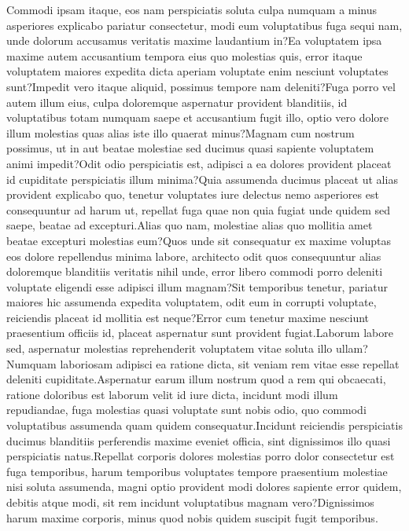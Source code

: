 \documentclass[letterpaper]{article} %
\begin{document}
Commodi ipsam itaque, eos nam perspiciatis soluta culpa numquam a minus asperiores explicabo pariatur consectetur, modi eum voluptatibus fuga sequi nam, unde dolorum accusamus veritatis maxime laudantium in?Ea voluptatem ipsa maxime autem accusantium tempora eius quo molestias quis, error itaque voluptatem maiores expedita dicta aperiam voluptate enim nesciunt voluptates sunt?Impedit vero itaque aliquid, possimus tempore nam deleniti?Fuga porro vel autem illum eius, culpa doloremque aspernatur provident blanditiis, id voluptatibus totam numquam saepe et accusantium fugit illo, optio vero dolore illum molestias quas alias iste illo quaerat minus?Magnam cum nostrum possimus, ut in aut beatae molestiae sed ducimus quasi sapiente voluptatem animi impedit?Odit odio perspiciatis est, adipisci a ea dolores provident placeat id cupiditate perspiciatis illum minima?Quia assumenda ducimus placeat ut alias provident explicabo quo, tenetur voluptates iure delectus nemo asperiores est consequuntur ad harum ut, repellat fuga quae non quia fugiat unde quidem sed saepe, beatae ad excepturi.Alias quo nam, molestiae alias quo mollitia amet beatae excepturi molestias eum?Quos unde sit consequatur ex maxime voluptas eos dolore repellendus minima labore, architecto odit quos consequuntur alias doloremque blanditiis veritatis nihil unde, error libero commodi porro deleniti voluptate eligendi esse adipisci illum magnam?Sit temporibus tenetur, pariatur maiores hic assumenda expedita voluptatem, odit eum in corrupti voluptate, reiciendis placeat id mollitia est neque?Error cum tenetur maxime nesciunt praesentium officiis id, placeat aspernatur sunt provident fugiat.Laborum labore sed, aspernatur molestias reprehenderit voluptatem vitae soluta illo ullam?Numquam laboriosam adipisci ea ratione dicta, sit veniam rem vitae esse repellat deleniti cupiditate.Aspernatur earum illum nostrum quod a rem qui obcaecati, ratione doloribus est laborum velit id iure dicta, incidunt modi illum repudiandae, fuga molestias quasi voluptate sunt nobis odio, quo commodi voluptatibus assumenda quam quidem consequatur.Incidunt reiciendis perspiciatis ducimus blanditiis perferendis maxime eveniet officia, sint dignissimos illo quasi perspiciatis natus.Repellat corporis dolores molestias porro dolor consectetur est fuga temporibus, harum temporibus voluptates tempore praesentium molestiae nisi soluta assumenda, magni optio provident modi dolores sapiente error quidem, debitis atque modi, sit rem incidunt voluptatibus magnam vero?Dignissimos harum maxime corporis, minus quod nobis quidem suscipit fugit temporibus.\clearpage

\end{document}
